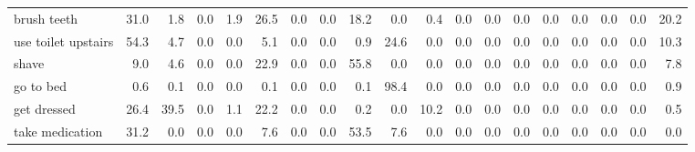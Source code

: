 \documentclass{article}
\begin{document}
\begin{sideways}
\begin{tabular}{lrrrrrrrrrrrrrrrrrr}
brush teeth                   &        31.0 &                1.8 &           0.0 &                          1.9 &               26.5 &                0.0 &                        0.0 &         18.2 &              0.0 &                0.4 &                    0.0 &                      0.0 &                  0.0 &                   0.0 &              0.0 &              0.0 &                                  0.0 &         20.2 \\
use toilet upstairs           &        54.3 &                4.7 &           0.0 &                          0.0 &                5.1 &                0.0 &                        0.0 &          0.9 &             24.6 &                0.0 &                    0.0 &                      0.0 &                  0.0 &                   0.0 &              0.0 &              0.0 &                                  0.0 &         10.3 \\
shave                         &         9.0 &                4.6 &           0.0 &                          0.0 &               22.9 &                0.0 &                        0.0 &         55.8 &              0.0 &                0.0 &                    0.0 &                      0.0 &                  0.0 &                   0.0 &              0.0 &              0.0 &                                  0.0 &          7.8 \\
go to bed                     &         0.6 &                0.1 &           0.0 &                          0.0 &                0.1 &                0.0 &                        0.0 &          0.1 &             98.4 &                0.0 &                    0.0 &                      0.0 &                  0.0 &                   0.0 &              0.0 &              0.0 &                                  0.0 &          0.9 \\
get dressed                   &        26.4 &               39.5 &           0.0 &                          1.1 &               22.2 &                0.0 &                        0.0 &          0.2 &              0.0 &               10.2 &                    0.0 &                      0.0 &                  0.0 &                   0.0 &              0.0 &              0.0 &                                  0.0 &          0.5 \\
take medication               &        31.2 &                0.0 &           0.0 &                          0.0 &                7.6 &                0.0 &                        0.0 &         53.5 &              7.6 &                0.0 &                    0.0 &                      0.0 &                  0.0 &                   0.0 &              0.0 &              0.0 &                                  0.0 &          0.0 \\

\end{tabular}
\end{sideways}
\end{document}
